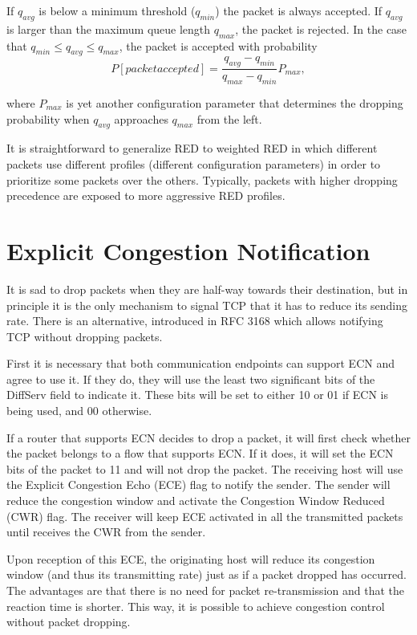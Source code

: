 If $q_{avg}$ is below a minimum threshold ($q_{min}$) the packet is always accepted.
If $q_{avg}$ is larger than the maximum queue length $q_{max}$, the packet is rejected.
In the case that $q_{min} \leq q_{avg} \leq q_{max}$, the packet is accepted with probability
\begin{equation}
P[packet accepted] = \frac{q_{avg}-q_{min}}{q_{max}-q_{min}}P_{max},
\end{equation}

where $P_{max}$ is yet another configuration parameter that determines the dropping probability when $q_{avg}$ approaches $q_{max}$ from the left.

It is straightforward to generalize RED to weighted RED in which different packets use different profiles (different configuration parameters) in order to prioritize some packets over the others.
Typically, packets with higher dropping precedence are exposed to more aggressive RED profiles.

\section{Explicit Congestion Notification}

It is sad to drop packets when they are half-way towards their destination, but in principle it is the only mechanism to signal TCP that it has to reduce its sending rate.
There is an alternative, introduced in  RFC 3168 \cite{rfc3168} which allows notifying TCP without dropping packets.

First it is necessary that both communication endpoints can support ECN and agree to use it.
If they do, they will use the least two significant bits of the DiffServ field to indicate it.
These bits will be set to either 10 or 01 if ECN is being used, and 00 otherwise.

If a router that supports ECN decides to drop a packet, it will first check whether the packet belongs to a flow that supports ECN.
If it does, it will set the ECN bits of the packet to 11 and will not drop the packet.
The receiving host will use the Explicit Congestion Echo (ECE) flag to notify the sender.
The sender will reduce the congestion window and activate the Congestion Window Reduced (CWR) flag.
The receiver will keep ECE activated in all the transmitted packets until receives the CWR from the sender.

Upon reception of this ECE, the originating host will reduce its congestion window (and thus its transmitting rate) just as if a packet dropped has occurred.
The advantages are that there is no need for packet re-transmission and that the reaction time is shorter.
This way, it is possible to achieve congestion control without packet dropping.

